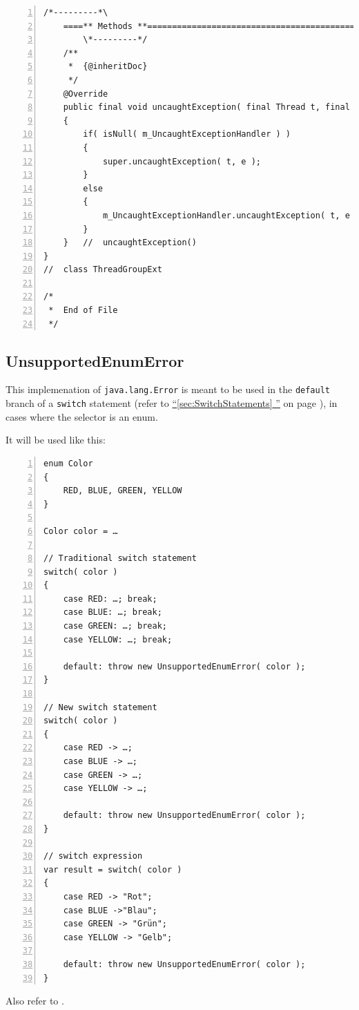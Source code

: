 \documentclass[11pt,a4paper, titlepage, parskip=half, headsepline, footsepline, cleardoublepage=current, headheight=1cm]{scrbook}
\newcommand*{\tqfullvref}[1]{\hyperref[{#1}]{“\ref*{#1} \nameref*{#1}”} on page \pageref{#1}}
\begin{document}
\begin{lstlisting}[numbers=left,caption={ThreadGroupExt.java}]
        /*---------*\
    ====** Methods **================================================
        \*---------*/
    /**
     *  {@inheritDoc}
     */
    @Override
    public final void uncaughtException( final Thread t, final Throwable e )
    {
        if( isNull( m_UncaughtExceptionHandler ) )
        {
            super.uncaughtException( t, e );
        }
        else
        {
            m_UncaughtExceptionHandler.uncaughtException( t, e );
        }
    }   //  uncaughtException()
}
//  class ThreadGroupExt

/*
 *  End of File
 */
\end{lstlisting}


\subsection{UnsupportedEnumError}\label{sec:UnsupportedEnumError}
This implemenation of \lstinline|java.lang.Error| is meant to be used in the \lstinline|default| branch of a \lstinline|switch| statement (refer to \tqfullvref{sec:SwitchStatements}), in cases where the selector is an enum.

It will be used like this:
\begin{lstlisting}[numbers=left]
enum Color
{
    RED, BLUE, GREEN, YELLOW
}

Color color = …    

// Traditional switch statement
switch( color )
{
    case RED: …; break;
    case BLUE: …; break;
    case GREEN: …; break;
    case YELLOW: …; break;

    default: throw new UnsupportedEnumError( color );
}

// New switch statement
switch( color )
{
    case RED -> …;
    case BLUE -> …;
    case GREEN -> …;
    case YELLOW -> …;

    default: throw new UnsupportedEnumError( color );
}

// switch expression
var result = switch( color )
{
    case RED -> "Rot";
    case BLUE ->"Blau";
    case GREEN -> "Grün";
    case YELLOW -> "Gelb";

    default: throw new UnsupportedEnumError( color );
}
\end{lstlisting}

Also refer to \autocite{TQUADRAT_ORG_FOUNDATION_UNSUPPORTEDENUMERROR}.
\end{document}
